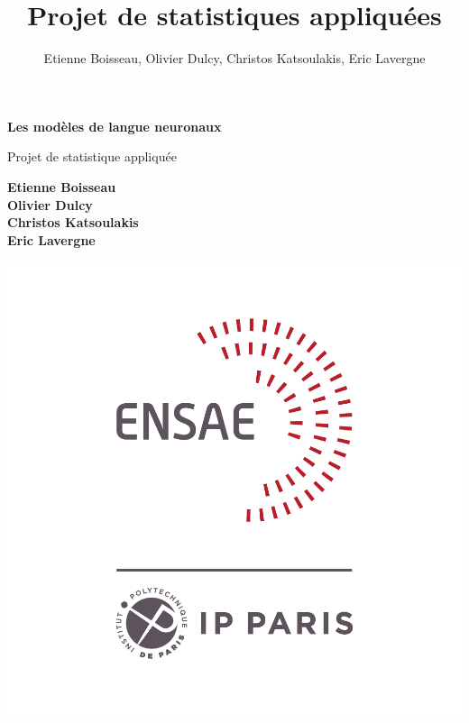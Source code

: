 

\title{Projet de statistiques appliquées}
\author{Etienne Boisseau, Olivier Dulcy, Christos Katsoulakis, Eric Lavergne}
\date{}
\makeatletter

\pagestyle{theme}

\newcommand{\dm}{d_{model}}




\begin{titlepage}
   \begin{center}
       \vspace*{1cm}
 
       {\Huge
       \textbf{Les modèles de langue neuronaux}
       }

       \vspace{0.5cm}

       {\LARGE
       Projet de statistique appliquée
       }

       \vspace{1.5cm}
       
       \Large
 
       \textbf{Etienne Boisseau} \\
       \textbf{Olivier Dulcy}\\
       \textbf{Christos Katsoulakis}\\
       \textbf{Eric Lavergne}
       
       \vspace{1cm}
       \includegraphics[scale=0.2]{img/LOGO-ENSAE}\par
       \vspace{1cm}
 

\end{center}
\end{titlepage}

